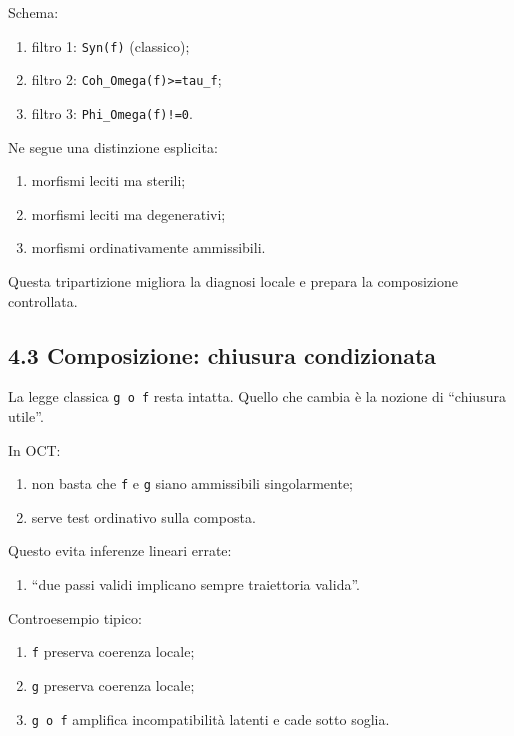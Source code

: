 Schema:

\begin{enumerate}
\def\labelenumi{\arabic{enumi}.}
\tightlist
\item
  filtro 1: \texttt{Syn(f)} (classico);
\item
  filtro 2: \texttt{Coh\_Omega(f)\textgreater{}=tau\_f};
\item
  filtro 3: \texttt{Phi\_Omega(f)!=0}.
\end{enumerate}

Ne segue una distinzione esplicita:

\begin{enumerate}
\def\labelenumi{\arabic{enumi}.}
\tightlist
\item
  morfismi leciti ma sterili;
\item
  morfismi leciti ma degenerativi;
\item
  morfismi ordinativamente ammissibili.
\end{enumerate}

Questa tripartizione migliora la diagnosi locale e prepara la composizione controllata.

\subsection{4.3 Composizione: chiusura condizionata}

La legge classica \texttt{g\ o\ f} resta intatta. Quello che cambia è la nozione di ``chiusura utile''.

In OCT:

\begin{enumerate}
\def\labelenumi{\arabic{enumi}.}
\tightlist
\item
  non basta che \texttt{f} e \texttt{g} siano ammissibili singolarmente;
\item
  serve test ordinativo sulla composta.
\end{enumerate}

Questo evita inferenze lineari errate:

\begin{enumerate}
\def\labelenumi{\arabic{enumi}.}
\tightlist
\item
  ``due passi validi implicano sempre traiettoria valida''.
\end{enumerate}

Controesempio tipico:

\begin{enumerate}
\def\labelenumi{\arabic{enumi}.}
\tightlist
\item
  \texttt{f} preserva coerenza locale;
\item
  \texttt{g} preserva coerenza locale;
\item
  \texttt{g\ o\ f} amplifica incompatibilità latenti e cade sotto soglia.
\end{enumerate}

